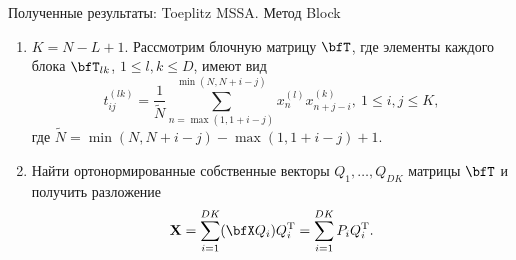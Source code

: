 \documentclass[ucs, notheorems, handout]{beamer}
\begin{document}
\begin{frame}{Полученные результаты: Toeplitz MSSA. Метод Block}
	

	\begin{enumerate}
		\item $K=N-L+1$. Рассмотрим блочную матрицу $\bfT$, где элементы каждого блока $\bfT_{lk}$, $1\leqslant l,k\leqslant D$, имеют вид
		\begin{equation}\label{eq:block_elements}
			t^{(lk)}_{ij}=\frac{1}{\tilde N}\sum_{n=\max(1,1+i-j)}^{\min(N,N+i-j)} x^{(l)}_nx^{(k)}_{n+j-i},\ 1\leqslant i,j\leqslant K,
		\end{equation}
		где $\tilde N=\min(N,N+i-j)-\max(1,1+i-j)+1$.
		\item Найти ортонормированные собственные векторы $Q_1,\ldots,Q_{DK}$ матрицы $\bfT$ и получить разложение
		\begin{equation}\label{eq:block_decomposition}
			\mathbf{X}=\sum_{i=1}^{DK} (\bfX Q_i) Q_i^\mathrm{T}=\sum_{i=1}^{DK} P_i Q_i^\mathrm{T}.   
		\end{equation}
	\end{enumerate}
\end{frame}
\end{document}
